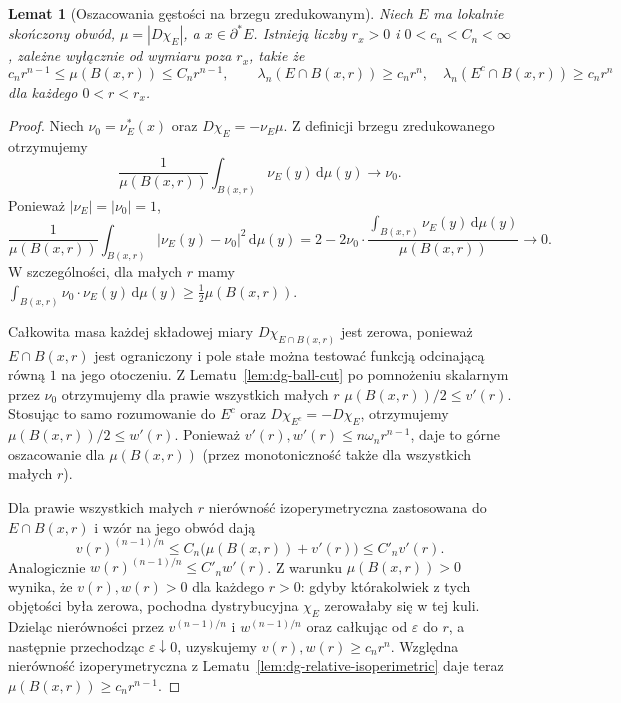 \documentclass[11pt,a4paper,oneside]{book}
\numberwithin{equation}{chapter}
\theoremstyle{plain}
\newtheorem{lemat}[twierdzenie]{Lemat}
\theoremstyle{definition}
\theoremstyle{remark}
\begin{document}
\begin{lemat}[Oszacowania gęstości na brzegu zredukowanym]
\label{lem:dg-density}
Niech $E$ ma lokalnie skończony obwód,
$\mu=|D\chi_E|$, a $x\in\partial^*E$.
Istnieją liczby $r_x>0$ i $0<c_n<C_n<\infty$,
zależne wyłącznie od wymiaru poza $r_x$, takie że
\[
 c_nr^{n-1}\le\mu(B(x,r))\le C_nr^{n-1},\qquad
 \lambda_n(E\cap B(x,r))\ge c_nr^n,\quad
 \lambda_n(E^c\cap B(x,r))\ge c_nr^n
\]
dla każdego $0<r<r_x$.
\end{lemat}
\begin{proof}
Niech $\nu_0=\nu_E^*(x)$ oraz
$D\chi_E=-\nu_E\mu$. Z definicji brzegu
zredukowanego otrzymujemy
\[
 \frac{1}{\mu(B(x,r))}\int_{B(x,r)}\nu_E(y)
 \,\mathrm d\mu(y)\longrightarrow\nu_0.
\]
Ponieważ $|\nu_E|=|\nu_0|=1$,
\[
 \frac1{\mu(B(x,r))}\int_{B(x,r)}
 |\nu_E(y)-\nu_0|^2\,\mathrm d\mu(y)
 =2-2\nu_0\cdot\frac{\int_{B(x,r)}\nu_E(y)\,\mathrm d\mu(y)}
 {\mu(B(x,r))}\longrightarrow0.
\]
W szczególności, dla małych $r$ mamy
$\int_{B(x,r)}\nu_0\cdot\nu_E(y)\,\mathrm d\mu(y)
\ge\frac12\mu(B(x,r))$.

Całkowita masa każdej składowej miary
$D\chi_{E\cap B(x,r)}$ jest zerowa, ponieważ
$E\cap B(x,r)$ jest ograniczony i pole stałe
można testować funkcją odcinającą równą $1$
na jego otoczeniu. Z Lematu~\ref{lem:dg-ball-cut}
po pomnożeniu skalarnym przez $\nu_0$ otrzymujemy
dla prawie wszystkich małych $r$
$\mu(B(x,r))/2\le v'(r)$.
Stosując to samo rozumowanie do $E^c$ oraz
$D\chi_{E^c}=-D\chi_E$, otrzymujemy
$\mu(B(x,r))/2\le w'(r)$.
Ponieważ $v'(r),w'(r)\le n\omega_n r^{n-1}$,
daje to górne oszacowanie dla $\mu(B(x,r))$
(przez monotoniczność także dla wszystkich
małych $r$).

Dla prawie wszystkich małych $r$ nierówność
izoperymetryczna zastosowana do $E\cap B(x,r)$
i wzór na jego obwód dają
\[
 v(r)^{(n-1)/n}\le C_n
 \bigl(\mu(B(x,r))+v'(r)\bigr)
 \le C'_n v'(r).
\]
Analogicznie $w(r)^{(n-1)/n}\le C'_nw'(r)$.
Z warunku $\mu(B(x,r))>0$ wynika, że
$v(r),w(r)>0$ dla każdego $r>0$:
gdyby którakolwiek z tych objętości była zerowa,
pochodna dystrybucyjna $\chi_E$ zerowałaby się
w tej kuli. Dzieląc nierówności przez
$v^{(n-1)/n}$ i $w^{(n-1)/n}$ oraz całkując
od $\varepsilon$ do $r$, a następnie przechodząc
$\varepsilon\downarrow0$, uzyskujemy
$v(r),w(r)\ge c_nr^n$.
Względna nierówność izoperymetryczna z
Lematu~\ref{lem:dg-relative-isoperimetric}
daje teraz $\mu(B(x,r))\ge c_nr^{n-1}$.
\end{proof}
\end{document}
